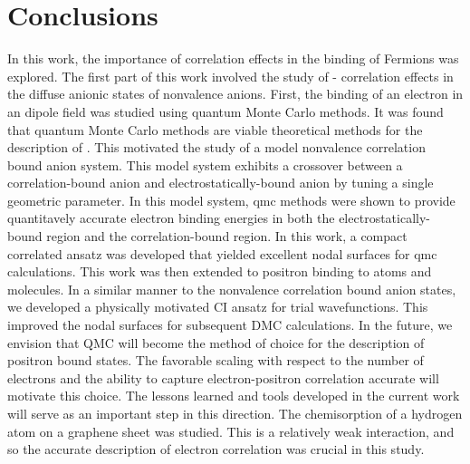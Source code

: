\chapter{Conclusions}

In this work, the importance of correlation effects in the binding of Fermions was explored.
The first part of this work involved the study of - correlation effects in the diffuse anionic states of nonvalence anions.
First, the binding of an electron in an dipole field was studied using quantum Monte Carlo methods.
It was found that quantum Monte Carlo methods are viable theoretical methods for the description of .
This motivated the study of a model  nonvalence correlation bound anion system.
This model system exhibits a crossover between a correlation-bound anion and electrostatically-bound anion by tuning a single geometric parameter.
In this model system, \gls{qmc} methods were shown to provide quantitavely accurate electron binding energies in both the electrostatically-bound region and the correlation-bound region.
In this work, a compact correlated ansatz was developed that yielded excellent nodal surfaces for \gls{qmc} calculations.
This work was then extended to positron binding to atoms and molecules.
In a similar manner to the nonvalence correlation bound anion states, we developed a physically motivated CI ansatz for trial wavefunctions.
This improved the nodal surfaces for subsequent DMC calculations.
In the future, we envision that QMC will become the method of choice for the description of positron bound states.
The favorable scaling with respect to the number of electrons and the ability to capture electron-positron correlation accurate will motivate this choice.
The lessons learned and tools developed in the current work will serve as an important step in this direction.
The chemisorption of a hydrogen atom on a graphene sheet was studied.
This is a relatively weak interaction, and so the accurate description of electron correlation was crucial in this study.
